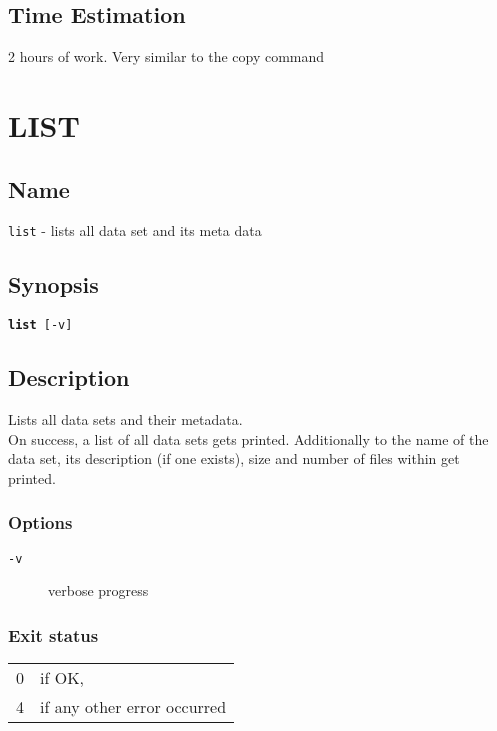 \documentclass{article} %
\begin{document}
				\subsection*{Time Estimation}
				2 hours of work. Very similar to the copy command\\
				\noindent
		\newpage
		\section*{LIST}
		\subsection*{Name}
		\texttt{list} - lists all data set and its meta data
		\subsection*{Synopsis}
		\texttt{\textbf{list} [-v]}
		\subsection*{Description}
		Lists all data sets and their metadata.\\
		
		\noindent On success, a list of all data sets gets printed. Additionally to the name of the data set, its description (if one exists), size and number of files within get printed.
		\subsubsection*{Options}
		\begin{description}
			\item[\texttt{-v}] verbose progress
		\end{description}
		
		\subsubsection*{Exit status}
		\begin{tabular}{ll}
			0 &  if OK,\\ 
			4 &  if any other error occurred\\
		\end{tabular}
\end{document}
